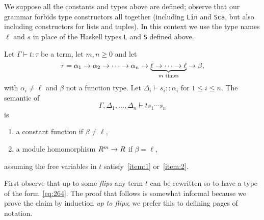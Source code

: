 We suppose all the constants and types above are defined; observe that
our grammar forbids type constructors all together (including
\lstinline{Lin} and \lstinline{Sca}, but also including constructors for
lists and tuples). In this context we use the type names $\ell$ and
$s$ in place of the Haskell types \lstinline{L} and \lstinline{S}
defined above.

\begin{lemma}
  \label{th:lininference}
  Let $\Gamma\vdash t:\tau$ be a term, let $m,n\ge0$ and let
  \begin{equation}
    \label{eq:264}
    \tau=\alpha_1\rightarrow\alpha_2\rightarrow\cdots\rightarrow\alpha_n\rightarrow\underbrace{\ell\rightarrow\cdots\rightarrow\ell}_{\text{$m$ times}}\rightarrow\beta
    \text{,}    
  \end{equation}
  with $\alpha_i\ne\ell$ and $\beta$ not a function type. Let
  $\Delta_i\vdash s_i::\alpha_i$ for $1\le i\le n$. The semantic of
  \begin{equation}
    \label{eq:270}
    \Gamma,\Delta_1,\ldots,\Delta_n\vdash ts_1\cdots s_n
  \end{equation}
  is
  \begin{enumerate}
  \item\label{item:1} a constant function if $\beta\ne\ell$,
  \item\label{item:2} a module homomorphism $R^m\rightarrow R$ if $\beta=\ell$,
  \end{enumerate}
  assuming the free variables in $t$ satisfy~\ref{item:1}
  or~\ref{item:2}.
\end{lemma}

First observe that up to some \emph{flips} any term $t$ can be
rewritten so to have a type of the form~\eqref{eq:264}. The proof that
follows is somewhat informal because we prove the claim by induction
\emph{up to flips}; we prefer this to defining pages of notation.

